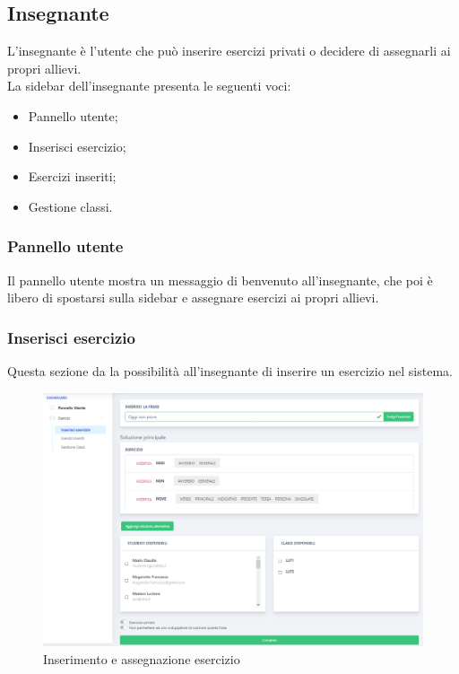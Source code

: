         
        
\newpage
    \subsection{Insegnante}
      L'insegnante è l'utente che può inserire esercizi privati o decidere di assegnarli ai propri allievi. 
         \\La sidebar dell'insegnante presenta le seguenti voci:
        	\begin{itemize}
            	\item Pannello utente;
            	\item Inserisci esercizio;
            	\item Esercizi inseriti;
            	\item Gestione classi.
        	\end{itemize}
        
        
        
        \subsubsection{Pannello utente}
          Il pannello utente mostra un messaggio di benvenuto all'insegnante, che poi è libero di spostarsi sulla sidebar e assegnare esercizi ai propri allievi.
        
        
        \subsubsection{Inserisci esercizio}
          Questa sezione da la possibilità all'insegnante di inserire un esercizio nel sistema.
        	\begin{figure}[H]
            	\centering
        		\includegraphics[width=17cm]{sez/img/insegnante/inserisciEsercizio.PNG} 
            	\caption{Inserimento e assegnazione esercizio}\label{fig:1}
        	\end{figure}
        
